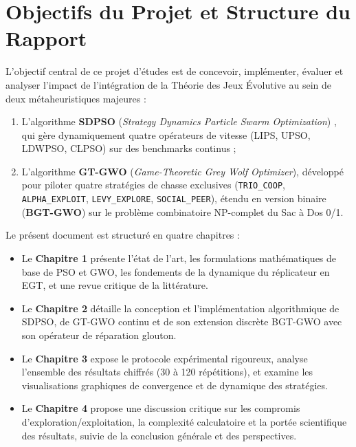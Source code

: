 \section{Objectifs du Projet et Structure du Rapport}
L'objectif central de ce projet d'études est de concevoir, implémenter, évaluer et analyser l'impact de l'intégration de la Théorie des Jeux Évolutive au sein de deux métaheuristiques majeures :
\begin{enumerate}[label=\textbf{(\roman*)}]
    \item L'algorithme \textbf{SDPSO} (\textit{Strategy Dynamics Particle Swarm Optimization}) \cite{liu2022strategy}, qui gère dynamiquement quatre opérateurs de vitesse (LIPS, UPSO, LDWPSO, CLPSO) sur des benchmarks continus ;
    \item L'algorithme \textbf{GT-GWO} (\textit{Game-Theoretic Grey Wolf Optimizer}), développé pour piloter quatre stratégies de chasse exclusives (\texttt{TRIO\_COOP}, \texttt{ALPHA\_EXPLOIT}, \texttt{LEVY\_EXPLORE}, \texttt{SOCIAL\_PEER}), étendu en version binaire (\textbf{BGT-GWO}) sur le problème combinatoire NP-complet du Sac à Dos 0/1.
\end{enumerate}

Le présent document est structuré en quatre chapitres :
\begin{itemize}[label=\textbullet]
    \item Le \textbf{Chapitre 1} présente l'état de l'art, les formulations mathématiques de base de PSO et GWO, les fondements de la dynamique du réplicateur en EGT, et une revue critique de la littérature.
    \item Le \textbf{Chapitre 2} détaille la conception et l'implémentation algorithmique de SDPSO, de GT-GWO continu et de son extension discrète BGT-GWO avec son opérateur de réparation glouton.
    \item Le \textbf{Chapitre 3} expose le protocole expérimental rigoureux, analyse l'ensemble des résultats chiffrés (30 à 120 répétitions), et examine les visualisations graphiques de convergence et de dynamique des stratégies.
    \item Le \textbf{Chapitre 4} propose une discussion critique sur les compromis d'exploration/exploitation, la complexité calculatoire et la portée scientifique des résultats, suivie de la conclusion générale et des perspectives.
\end{itemize}
